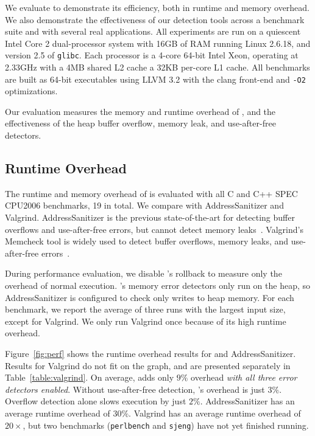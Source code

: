 \label{sec:evaluation}

We evaluate \doubletake{} to demonstrate its efficiency, both in runtime and memory overhead. We also demonstrate the effectiveness of our detection tools across a benchmark suite and with several real applications. All experiments are run on a quiescent Intel Core 2 dual-processor system with 16GB of RAM running Linux 2.6.18, and version 2.5 of \texttt{glibc}. Each processor is a 4-core 64-bit Intel Xeon, operating at 2.33GHz with a 4MB shared L2 cache a 32KB per-core L1 cache. All benchmarks are built as 64-bit executables using LLVM 3.2 with the clang front-end and \texttt{-O2} optimizations.


Our evaluation measures the memory and runtime overhead of \doubletake{}, and the effectiveness of the heap buffer overflow, memory leak, and use-after-free detectors.

\subsection{Runtime Overhead}
\label{sec:evaluation/runtime}





The runtime and memory overhead of \doubletake{} is evaluated with all C and C++ SPEC CPU2006 benchmarks, 19 in total. We compare \doubletake{} with AddressSanitizer and Valgrind. AddressSanitizer is the previous state-of-the-art for detecting buffer overflows and use-after-free errors, but cannot detect memory leaks~\cite{AddressSanitizer}. Valgrind's Memcheck tool is widely used to detect buffer overflows, memory leaks, and use-after-free errors~\cite{overflow:valgrind}. 



During performance evaluation, we disable \doubletake{}'s rollback to measure only the overhead of normal execution. \doubletake{}'s memory error detectors only run on the heap, so AddressSanitizer is configured to check only writes to heap memory. For each benchmark, we report the average of three runs with the largest input size, except for Valgrind. We only run Valgrind once because of its high runtime overhead. 

Figure~\ref{fig:perf} shows the runtime overhead results for \doubletake{} and AddressSanitizer. Results for Valgrind do not fit on the graph, and are presented separately in Table~\ref{table:valgrind}. On average, \doubletake{} adds only $9\%$ overhead \emph{with all three error detectors enabled}. Without use-after-free detection, \doubletake{}'s overhead is just $3\%$. Overflow detection alone slows execution by just $2\%$. AddressSanitizer has an average runtime overhead of $30\%$. Valgrind has an average runtime overhead of $20\times$, but two benchmarks (\texttt{perlbench} and \texttt{sjeng}) have not yet finished running.

